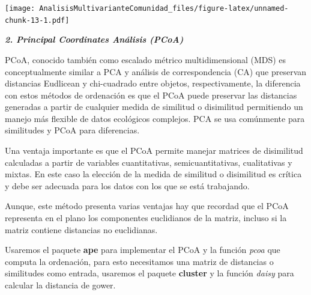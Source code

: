 \documentclass[]{book}
\newenvironment{Shaded}{\begin{snugshade}}{\end{snugshade}}
\newcommand{\KeywordTok}[1]{\textcolor[rgb]{0.13,0.29,0.53}{\textbf{{#1}}}}
\newcommand{\StringTok}[1]{\textcolor[rgb]{0.31,0.60,0.02}{{#1}}}
\newcommand{\CommentTok}[1]{\textcolor[rgb]{0.56,0.35,0.01}{\textit{{#1}}}}
\newcommand{\NormalTok}[1]{{#1}}
\begin{document}
\texttt{[image: AnalisisMultivarianteComunidad\_files/figure-latex/unnamed-chunk-13-1.pdf]}

\textbf{\emph{2. Principal Coordinates Análisis (PCoA)}}

PCoA, conocido también como escalado métrico multidimensional (MDS) es
conceptualmente similar a PCA y análisis de correspondencia (CA) que
preservan distancias Eudlicean y chi-cuadrado entre objetos,
respectivamente, la diferencia con estos métodos de ordenación es que el
PCoA puede preservar las distancias generadas a partir de cualquier
medida de similitud o disimilitud permitiendo un manejo más flexible de
datos ecológicos complejos. PCA se usa comúnmente para similitudes y
PCoA para diferencias.

Una ventaja importante es que el PCoA permite manejar matrices de
disimilitud calculadas a partir de variables cuantitativas,
semicuantitativas, cualitativas y mixtas. En este caso la elección de la
medida de similitud o disimilitud es crítica y debe ser adecuada para
los datos con los que se está trabajando.

Aunque, este método presenta varias ventajas hay que recordad que el
PCoA representa en el plano los componentes euclidianos de la matriz,
incluso si la matriz contiene distancias no euclidianas.

Usaremos el paquete \textbf{ape} para implementar el PCoA y la función
\emph{pcoa} que computa la ordenación, para esto necesitamos una matriz
de distancias o similitudes como entrada, usaremos el paquete
\textbf{cluster} y la función \emph{daisy} para calcular la distancia de
gower.

\begin{Shaded}
\end{Shaded}
\end{document}
